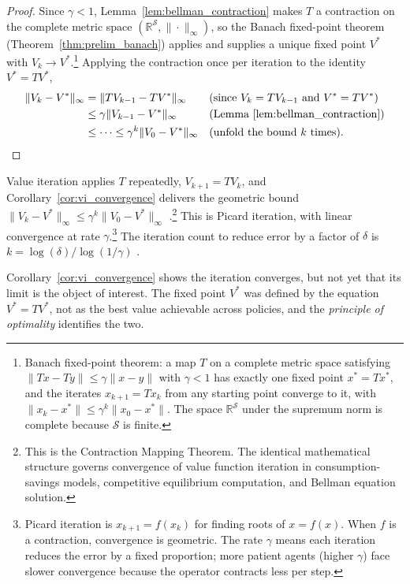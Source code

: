 \begin{proof}
Since $\gamma < 1$, Lemma~\ref{lem:bellman_contraction} makes $T$ a contraction on the complete metric space $(\mathbb{R}^{\mathcal{S}}, \|\cdot\|_\infty)$, so the Banach fixed-point theorem (Theorem~\ref{thm:prelim_banach}) applies and supplies a unique fixed point $V^*$ with $V_k \to V^*$.\footnote{Banach fixed-point theorem: a map $T$ on a complete metric space satisfying $\|Tx - Ty\| \leq \gamma \|x - y\|$ with $\gamma < 1$ has exactly one fixed point $x^* = Tx^*$, and the iterates $x_{k+1} = Tx_k$ from any starting point converge to it, with $\|x_k - x^*\| \leq \gamma^k \|x_0 - x^*\|$. The space $\mathbb{R}^{\mathcal{S}}$ under the supremum norm is complete because $\mathcal{S}$ is finite.} Applying the contraction once per iteration to the identity $V^* = TV^*$,
\begin{align*}
\|V_k - V^*\|_\infty
  &= \|TV_{k-1} - TV^*\|_\infty
    && \text{(since $V_k = TV_{k-1}$ and $V^* = TV^*$)} \\
  &\leq \gamma \|V_{k-1} - V^*\|_\infty
    && \text{(Lemma~\ref{lem:bellman_contraction})} \\
  &\leq \cdots \leq \gamma^k \|V_0 - V^*\|_\infty
    && \text{(unfold the bound $k$ times).}
\end{align*}
\end{proof}

Value iteration applies $T$ repeatedly, $V_{k+1} = TV_k$, and Corollary~\ref{cor:vi_convergence} delivers the geometric bound $\|V_k - V^*\|_\infty \leq \gamma^k \|V_0 - V^*\|_\infty$ \citep{denardo1967}.\footnote{This is the Contraction Mapping Theorem. The identical mathematical structure governs convergence of value function iteration in consumption-savings models, competitive equilibrium computation, and Bellman equation solution.} This is Picard iteration, with linear convergence at rate $\gamma$.\footnote{Picard iteration is $x_{k+1} = f(x_k)$ for finding roots of $x = f(x)$. When $f$ is a contraction, convergence is geometric. The rate $\gamma$ means each iteration reduces the error by a fixed proportion; more patient agents (higher $\gamma$) face slower convergence because the operator contracts less per step.} The iteration count to reduce error by a factor of $\delta$ is $k = \log(\delta) / \log(1/\gamma)$ \citep{bertsekas1996}.

Corollary~\ref{cor:vi_convergence} shows the iteration converges, but not yet that its limit is the object of interest. The fixed point $V^*$ was defined by the equation $V^* = TV^*$, not as the best value achievable across policies, and the \emph{principle of optimality} identifies the two.

